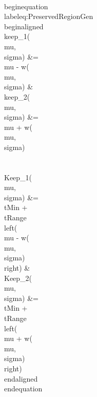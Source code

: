 \\begin{equation}\\label{eq:PreservedRegionGen}
\\begin{aligned}
\\keep_1(\\mu,\\sigma) &=                                    \\mu - w(\\mu,\\sigma) &            \\keep_2(\\mu,\\sigma) &=                                   \\mu + w(\\mu,\\sigma) \\\\
\\Keep_1(\\mu,\\sigma) &= \\tMin + \\tRange\\left( \\mu - w(\\mu,\\sigma) \\right) & \\Keep_2(\\mu,\\sigma) &= \\tMin + \\tRange \\left(\\mu + w(\\mu,\\sigma)\\right)
\\end{aligned}
\\end{equation}

